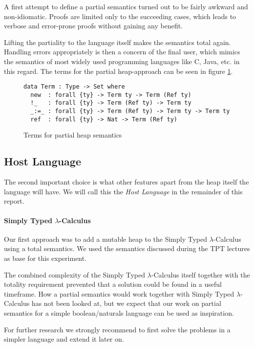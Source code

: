 \documentclass[12pt, a4paper, oneside]{article}
\begin{document}
A first attempt to define a partial semantics turned out to be fairly awkward and non-idiomatic. Proofs are limited only to the succeeding cases, which leads to verbose and error-prone proofs without gaining any benefit. 

Lifting the partiality to the language itself makes the semantics total again.
Handling errors appropriately is then a concern of the final user, which mimics the semantics of most widely used programming languages like C, Java, etc. in this regard.
The terms for the partial heap-approach can be seen in figure \ref{lst:part-term}.

\begin{figure}
\begin{lstlisting}
data Term : Type -> Set where
  new  : forall {ty} -> Term ty -> Term (Ref ty)
  !_   : forall {ty} -> Term (Ref ty) -> Term ty
  _:=_ : forall {ty} -> Term (Ref ty) -> Term ty -> Term ty
  ref  : forall {ty} -> Nat -> Term (Ref ty)
\end{lstlisting}
\caption{Terms for partial heap semantics}
\label{lst:part-term}
\end{figure}


\subsection{Host Language}
The second important choice is what other features apart from the heap itself the language will have. We will call this the \emph{Host Language} in the remainder of this report.


\paragraph{Simply Typed $\lambda$-Calculus}
Our first approach was to add a mutable heap to the Simply Typed $\lambda$-Calculus using a total semantics. We used the semantics discussed during the TPT lectures
as base for this experiment.

The combined complexity of the Simply Typed $\lambda$-Calculus itself together with the totality requirement prevented that a solution could be found in a useful timeframe.
How a partial semantics would work together with Simply Typed $\lambda$-Calculus has not been looked at, but we expect that our work on partial semantics for a simple
boolean/naturals language can be used as inspiration.

For further research we strongly recommend to first solve the problems in a simpler language and extend it later on.
\end{document}
